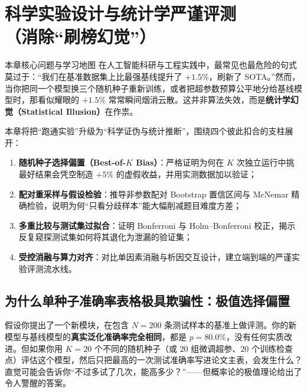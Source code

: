 \chapter[科学实验设计与统计学严谨评测]{科学实验设计与统计学严谨评测\\（消除“刷榜幻觉”）}\label{ch:rigorous-eval}


\begin{chapIntro}{本章核心问题与学习地图}
在人工智能科研与工程实践中，最常见也最危险的句式莫过于：“我们在基准数据集上比最强基线提升了 $+1.5\%$，刷新了 SOTA。”然而，当你把同一个模型换三个随机种子重新训练，或者把超参数预算公平地分给基线模型时，那看似耀眼的 $+1.5\%$ 常常瞬间烟消云散。这并非算法失效，而是\textbf{统计学幻觉（Statistical Illusion）}在作祟。

本章将把“跑通实验”升级为“科学证伪与统计推断”，围绕四个彼此扣合的支柱展开：
\begin{enumerate}
  \item \textbf{随机种子选择偏置（Best-of-$K$ Bias）}：严格证明为何在 $K$ 次独立运行中挑最好结果会凭空制造 $+5\%$ 的虚假收益，并用实测数据加以验证；
  \item \textbf{配对重采样与假设检验}：推导非参数配对 Bootstrap 置信区间与 McNemar 精确检验，说明为何“只看分歧样本”能大幅削减题目难度方差；
  \item \textbf{多重比较与测试集过拟合}：证明 Bonferroni 与 Holm--Bonferroni 校正，揭示反复窥探测试集如何将其退化为泄漏的验证集；
  \item \textbf{受控消融与算力对齐}：对比单因素消融与析因交互设计，建立端到端的严谨实验评测流水线。
\end{enumerate}
\end{chapIntro}

\section{为什么单种子准确率表格极具欺骗性：极值选择偏置}

假设你提出了一个新模块，在包含 $N=200$ 条测试样本的基准上做评测。你的新模型与基线模型的\textbf{真实泛化准确率完全相同}，都是 $p = 80.0\%$，没有任何实质改进。但如果你用 $K=20$ 个不同的随机种子（或 $20$ 组微调超参、$20$ 个训练检查点）评估这个模型，然后只把最高的一次测试准确率写进论文主表，会发生什么？直觉可能会告诉你“不过多试了几次，能高多少？”——但概率论的极值理论给出了令人警醒的答案。

